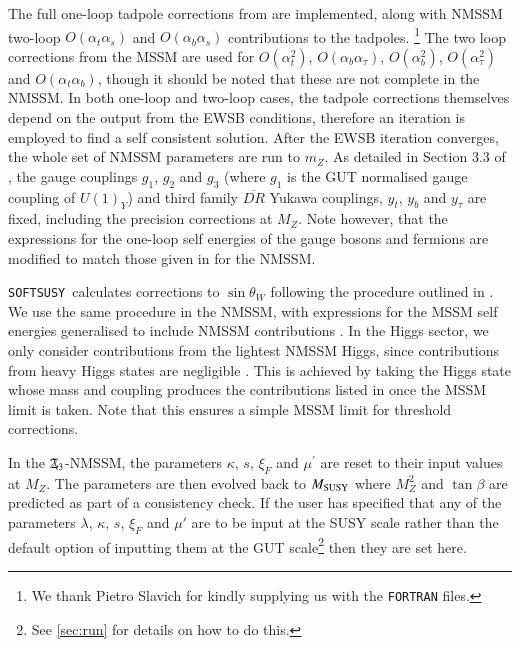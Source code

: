 \documentclass[final,3p,times]{elsarticle}
\def\SOFTSUSY{{\tt SOFTSUSY}}
\newcommand{\Zv}{\,\mathbf{\backslash}\mkern-11.0mu{\mathbb{Z}}_{3}} %
\def\at{\alpha_t}
\def\ab{\alpha_b}
\def\as{\alpha_s}
\def\atau{\alpha_{\tau}}
\def\oatab{O(\at\ab)}
\def\oatas{O(\at\as)}
\def\oabas{O(\ab\as)}
\def\oatq{O(\at^2)}
\def\oabq{O(\ab^2)}
\def\oatauq{O(\atau^2)}
\def\oabatau{O(\ab \atau)}
\begin{document}
The full one-loop tadpole corrections
 from \cite{Degrassi:2009yq} are implemented, along with NMSSM two-loop 
$\oatas$ and $\oabas$ contributions \cite{Degrassi:2009yq} to the tadpoles.%
\footnote{We thank Pietro Slavich for kindly supplying us with the {\tt FORTRAN}
 files.}
 The two loop corrections from the MSSM are used for $\oatq$, $\oabatau$, 
$\oabq$, $\oatauq$ and $\oatab$, though it should be noted that these are not
complete in the NMSSM.  In both one-loop and two-loop cases, the tadpole 
corrections themselves depend on the output from the EWSB conditions, therefore 
an iteration is employed to find a self consistent solution.
After the EWSB iteration converges, the whole set of NMSSM parameters are run to
 $m_Z$. As detailed in Section 3.3 of \cite{Allanach:2001kg}, the gauge 
couplings $g_1$, $g_2$ and $g_3$ (where $g_1$ is the GUT normalised gauge 
coupling of $U(1)_Y$) and third family $\overline{DR}$ Yukawa couplings, $y_t$, 
$y_b$ and $y_\tau$ are fixed, including the precision corrections at $M_Z$.  Note
 however, that the expressions for the one-loop self energies of the gauge 
bosons and fermions are modified to match those given in \cite{Degrassi:2009yq}
 for the NMSSM.

\SOFTSUSY~calculates corrections to $\sin \theta_W$ following the procedure outlined 
in \cite{Pierce:1997zz}.  We use the same procedure in the NMSSM, with expressions 
for the MSSM self energies \cite{Pierce:1997zz} generalised to include NMSSM contributions 
\cite{Degrassi:2009yq}.  In the Higgs sector, we only consider contributions from the 
lightest NMSSM Higgs, since contributions from heavy Higgs states are negligible 
\cite{Pierce:1997zz}.  This is achieved by taking the Higgs state whose mass and coupling 
produces the contributions listed in \cite{Pierce:1997zz} once the MSSM limit is taken.  
Note that this ensures a simple MSSM limit for threshold corrections. 

In the $\Zv$-NMSSM, the parameters $\kappa$, $s$, $\xi_F$ and $\mu^\prime$ are 
reset to their input values at $M_Z$.  The parameters are then evolved back to 
$M_{\rm SUSY}$ where $M_Z^2$ and $\tan\beta$ are predicted as part of a consistency 
check.  If the user has specified that any of the parameters $\lambda$, $\kappa$, $s$, 
$\xi_F$ and $\mu'$  are to be input at the SUSY scale rather than the default option of 
inputting them at the GUT scale\footnote{See \ref{sec:run} for details on how to do this.} 
then they are set here.  
\end{document}
